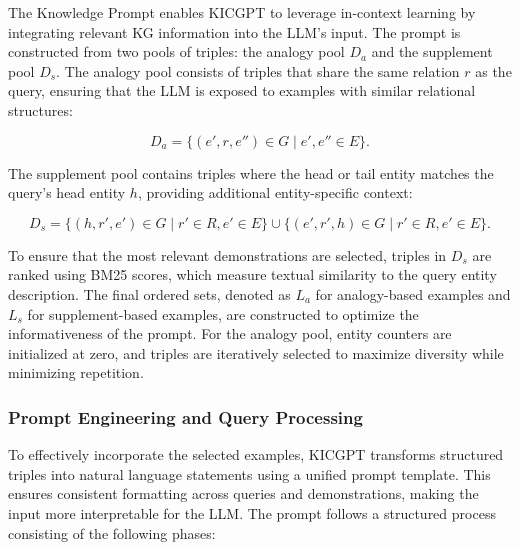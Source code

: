 \documentclass[12pt,a4paper]{article}
\begin{document}
The Knowledge Prompt enables KICGPT to leverage in-context learning by integrating relevant KG information into the LLM’s input. The prompt is constructed from two pools of triples: the analogy pool \( D_a \) and the supplement pool \( D_s \). The analogy pool consists of triples that share the same relation \( r \) as the query, ensuring that the LLM is exposed to examples with similar relational structures:

\[
    D_a = \{(e', r, e'') \in G \mid e', e'' \in E\}.
\]

The supplement pool contains triples where the head or tail entity matches the query's head entity \( h \), providing additional entity-specific context:

\[
    D_s = \{(h, r', e') \in G \mid r' \in R, e' \in E\} \cup \{(e', r', h) \in G \mid r' \in R, e' \in E\}.
\]

To ensure that the most relevant demonstrations are selected, triples in \( D_s \) are ranked using BM25 scores, which measure textual similarity to the query entity description.
The final ordered sets, denoted as \( L_a \) for analogy-based examples and \( L_s \) for supplement-based examples, are constructed to optimize the informativeness of the prompt.
For the analogy pool, entity counters are initialized at zero, and triples are iteratively selected to maximize diversity while minimizing repetition.

\subsubsection{Prompt Engineering and Query Processing}

To effectively incorporate the selected examples, KICGPT transforms structured triples into natural language statements using a unified prompt template. This ensures consistent formatting across queries and demonstrations, making the input more interpretable for the LLM. The prompt follows a structured process consisting of the following phases:
\end{document}
